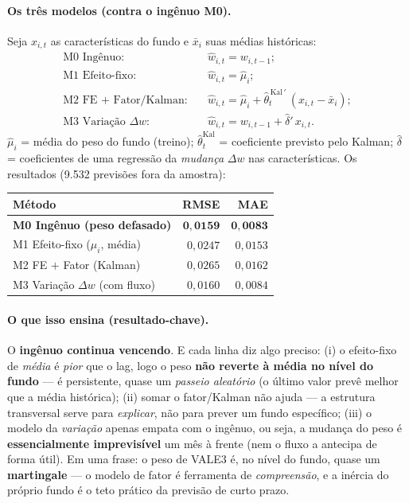 \documentclass[11pt]{article}
\begin{document}
\paragraph{Os três modelos (contra o ingênuo M0).} Seja $x_{i,t}$ as características do
fundo e $\bar x_i$ suas médias históricas:
\begin{align}
\text{M0 Ingênuo:}\quad        & \widehat{w}_{i,t}=w_{i,t-1};\\
\text{M1 Efeito-fixo:}\quad    & \widehat{w}_{i,t}=\widehat{\mu}_i;\\
\text{M2 FE + Fator/Kalman:}\quad & \widehat{w}_{i,t}=\widehat{\mu}_i+\widehat{\theta}_t^{\,\text{Kal}\,\prime}\,(x_{i,t}-\bar x_i);\\
\text{M3 Variação }\Delta w:\quad & \widehat{w}_{i,t}=w_{i,t-1}+\widehat{\delta}'\,x_{i,t}.
\end{align}
$\widehat{\mu}_i$ = média do peso do fundo (treino); $\widehat{\theta}_t^{\text{Kal}}$ =
coeficiente previsto pelo Kalman; $\widehat{\delta}$ = coeficientes de uma regressão da
\emph{mudança} $\Delta w$ nas características. Os resultados (9.532 previsões fora da
amostra):
\begin{center}
\begin{tabular}{@{}lrr@{}}
\toprule
Método & RMSE & MAE \\
\midrule
\textbf{M0 Ingênuo (peso defasado)} & $\mathbf{0{,}0159}$ & $\mathbf{0{,}0083}$ \\
M1 Efeito-fixo ($\mu_i$, média)     & $0{,}0247$ & $0{,}0153$ \\
M2 FE $+$ Fator (Kalman)            & $0{,}0265$ & $0{,}0162$ \\
M3 Variação $\Delta w$ (com fluxo)  & $0{,}0160$ & $0{,}0084$ \\
\bottomrule
\end{tabular}
\end{center}

\paragraph{O que isso ensina (resultado-chave).} O \textbf{ingênuo continua vencendo}.
E cada linha diz algo preciso: (i) o efeito-fixo de \emph{média} é \emph{pior} que o
lag, logo o peso \textbf{não reverte à média no nível do fundo} --- é persistente,
quase um \emph{passeio aleatório} (o último valor prevê melhor que a média histórica);
(ii) somar o fator/Kalman não ajuda --- a estrutura transversal serve para
\emph{explicar}, não para prever um fundo específico; (iii) o modelo da \emph{variação}
apenas empata com o ingênuo, ou seja, a mudança do peso é \textbf{essencialmente
imprevisível} um mês à frente (nem o fluxo a antecipa de forma útil). Em uma frase: o
peso de VALE3 é, no nível do fundo, quase um \textbf{martingale} --- o modelo de fator
é ferramenta de \emph{compreensão}, e a inércia do próprio fundo é o teto prático da
previsão de curto prazo.
\end{document}
